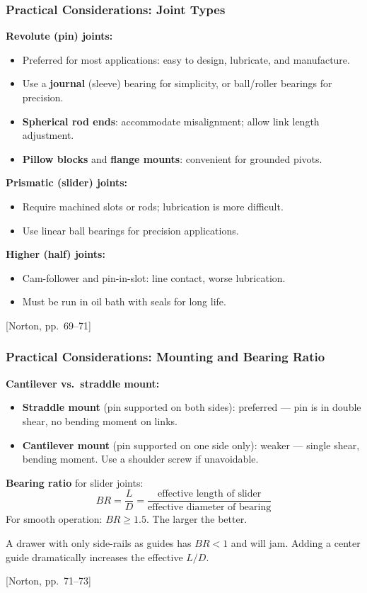 \documentclass[10pt,aspectratio=43]{beamer}
\newcommand{\pref}[1]{\vfill\hfill{\scriptsize\color{gray}[Norton, pp.~#1]}}
\begin{document}
\begin{frame}
\frametitle{Practical Considerations: Joint Types}

\textbf{Revolute (pin) joints:}
\begin{itemize}
  \item Preferred for most applications: easy to design, lubricate, and manufacture.
  \item Use a \textbf{journal} (sleeve) bearing for simplicity, or ball/roller bearings for precision.
  \item \textbf{Spherical rod ends}: accommodate misalignment; allow link length adjustment.
  \item \textbf{Pillow blocks} and \textbf{flange mounts}: convenient for grounded pivots.
\end{itemize}

\vspace{6pt}
\textbf{Prismatic (slider) joints:}
\begin{itemize}
  \item Require machined slots or rods; lubrication is more difficult.
  \item Use linear ball bearings for precision applications.
\end{itemize}

\vspace{6pt}
\textbf{Higher (half) joints:}
\begin{itemize}
  \item Cam-follower and pin-in-slot: line contact, worse lubrication.
  \item Must be run in oil bath with seals for long life.
\end{itemize}
\pref{69--71}
\end{frame}

\begin{frame}
\frametitle{Practical Considerations: Mounting and Bearing Ratio}

\textbf{Cantilever vs.\ straddle mount:}
\begin{itemize}
  \item \textbf{Straddle mount} (pin supported on both sides): preferred --- pin is in double shear, no bending moment on links.
  \item \textbf{Cantilever mount} (pin supported on one side only): weaker --- single shear, bending moment. Use a shoulder screw if unavoidable.
\end{itemize}

\vspace{6pt}
\begin{redbox}
\textbf{Bearing ratio} for slider joints:
\[
  BR = \frac{L}{D} = \frac{\text{effective length of slider}}{\text{effective diameter of bearing}}
\]
For smooth operation: $BR \geq 1.5$. The larger the better.

A drawer with only side-rails as guides has $BR < 1$ and will jam. Adding a center guide dramatically increases the effective $L/D$.
\end{redbox}
\pref{71--73}
\end{frame}
\end{document}
